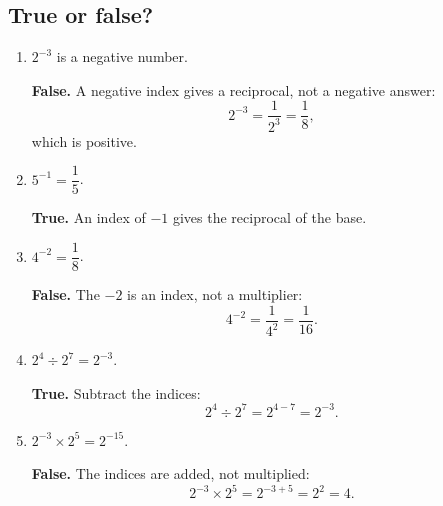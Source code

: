 \documentclass[11pt]{article}
\begin{document}
\subsection*{True or false?}
\begin{enumerate}
\item $2^{-3}$ is a negative number.

\textbf{False.} A negative index gives a reciprocal, not a negative answer:
\[
2^{-3}=\frac{1}{2^3}=\frac{1}{8},
\]
which is positive.

\item $5^{-1}=\dfrac{1}{5}$.

\textbf{True.} An index of $-1$ gives the reciprocal of the base.

\item $4^{-2}=\dfrac{1}{8}$.

\textbf{False.} The $-2$ is an index, not a multiplier:
\[
4^{-2}=\frac{1}{4^2}=\frac{1}{16}.
\]

\item $2^4\div2^7=2^{-3}$.

\textbf{True.} Subtract the indices:
\[
2^4\div2^7=2^{4-7}=2^{-3}.
\]

\item $2^{-3}\times2^5=2^{-15}$.

\textbf{False.} The indices are added, not multiplied:
\[
2^{-3}\times2^5=2^{-3+5}=2^2=4.
\]
\end{enumerate}
\end{document}
